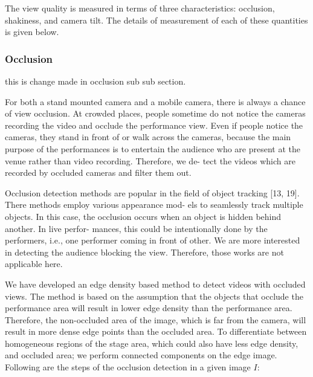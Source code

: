 \documentclass{new}
\begin{document}
The view quality is measured in terms of three characteristics:
occlusion, shakiness, and camera tilt. The details of measurement
of each of these quantities is given below.

\subsubsection{Occlusion}
this is change made in occlusion sub sub section.

For both a stand mounted camera and a mobile camera, there
is always a chance of view occlusion. At crowded places, people
sometime do not notice the cameras recording the video and occlude the performance view. Even if people notice the cameras,
they stand in front of or walk across the cameras, because the main
purpose of the performances is to entertain the audience who are
present at the venue rather than video recording. Therefore, we de-
tect the videos which are recorded by occluded cameras and filter
them out.

Occlusion detection methods are popular in the field of object
tracking [13, 19]. There methods employ various appearance mod-
els to seamlessly track multiple objects. In this case, the occlusion
occurs when an object is hidden behind another. In live perfor-
mances, this could be intentionally done by the performers, i.e.,
one performer coming in front of other. We are more interested in
detecting the audience blocking the view. Therefore, those works
are not applicable here.

We have developed an edge density based method to detect videos
with occluded views. The method is based on the assumption that
the objects that occlude the performance area will result in lower
edge density than the performance area. Therefore, the non-occluded
area of the image, which is far from the camera, will result in more
dense edge points than the occluded area. To differentiate between
homogeneous regions of the stage area, which could also have less
edge density, and occluded area; we perform connected components on the edge image. Following are the steps of the occlusion detection in a given image $\textit{I}$:
\end{document}
